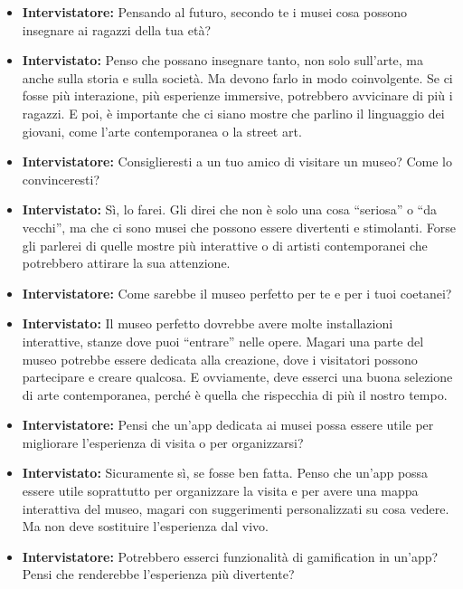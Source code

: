 \documentclass{article}
\begin{document}
\begin{itemize}
    \item \textbf{Intervistatore:} Pensando al futuro, secondo te i musei cosa possono insegnare ai ragazzi della tua età?

    \item \textbf{Intervistato:} Penso che possano insegnare tanto, non solo sull'arte, ma anche sulla storia e sulla società. Ma devono farlo in modo coinvolgente. Se ci fosse più interazione, più esperienze immersive, potrebbero avvicinare di più i ragazzi. E poi, è importante che ci siano mostre che parlino il linguaggio dei giovani, come l’arte contemporanea o la street art.

    \item \textbf{Intervistatore:} Consiglieresti a un tuo amico di visitare un museo? Come lo convinceresti?

    \item \textbf{Intervistato:} Sì, lo farei. Gli direi che non è solo una cosa “seriosa” o “da vecchi”, ma che ci sono musei che possono essere divertenti e stimolanti. Forse gli parlerei di quelle mostre più interattive o di artisti contemporanei che potrebbero attirare la sua attenzione.

    \item \textbf{Intervistatore:} Come sarebbe il museo perfetto per te e per i tuoi coetanei?

    \item \textbf{Intervistato:} Il museo perfetto dovrebbe avere molte installazioni interattive, stanze dove puoi “entrare” nelle opere. Magari una parte del museo potrebbe essere dedicata alla creazione, dove i visitatori possono partecipare e creare qualcosa. E ovviamente, deve esserci una buona selezione di arte contemporanea, perché è quella che rispecchia di più il nostro tempo.

    \item \textbf{Intervistatore:} Pensi che un’app dedicata ai musei possa essere utile per migliorare l’esperienza di visita o per organizzarsi?

    \item \textbf{Intervistato:} Sicuramente sì, se fosse ben fatta. Penso che un’app possa essere utile soprattutto per organizzare la visita e per avere una mappa interattiva del museo, magari con suggerimenti personalizzati su cosa vedere. Ma non deve sostituire l’esperienza dal vivo.

    \item \textbf{Intervistatore:} Potrebbero esserci funzionalità di gamification in un’app? Pensi che renderebbe l’esperienza più divertente?


\end{itemize}
\end{document}
